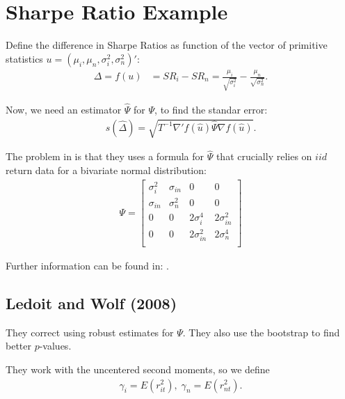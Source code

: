 \documentclass[12pt,oneside,a4paper]{article}
\begin{document}
\clearpage
\section{Sharpe Ratio Example}

Define the difference in Sharpe Ratios as function of the vector of primitive statistics $u = (\mu_{i}, \mu_{n}, \sigma^2_{i}, \sigma^2_{n})'$:
\begin{align}
\Delta = f(u) &= SR_{i} - SR_{n} 
= \frac{\mu_{i}}{\sqrt{\sigma^2_{i}}} - \frac{\mu_{n}}{\sqrt{\sigma^2_{n}}}.
\end{align}

Now, we need an estimator $\hat{\Psi}$ for $\Psi$, to find the standar error:
\begin{align}
s(\hat{\Delta}) = \sqrt{T^{-1} \nabla'f(\hat{u}) \hat{\Psi} \nabla f(\hat{u})}.
\end{align}

The problem in \cite{jb81-sr} is that they uses a formula for $\hat{\Psi}$ that crucially relies on $iid$ return data for a bivariate normal distribution:
\begin{align*}
\Psi = 
\begin{bmatrix}
\sigma^2_{i} & \sigma_{in} & 0 & 0 \\
\sigma_{in} & \sigma^2_{n} & 0 & 0 \\
0 & 0 & 2\sigma^{4}_{i} & 2\sigma^{2}_{in}  \\
0 & 0 & 2\sigma^{2}_{in} & 2\sigma^{4}_{n}  \\
\end{bmatrix}
\end{align*}

Further information can be found in: \cite{lo02-sr, jb81-sr}.

\subsection{Ledoit and Wolf (2008)}

They correct \cite{jb81-sr} using robust estimates for $\Psi$.
They also use the bootstrap to find better $p$-values.

They work with the uncentered second moments, so we define 
\begin{align*}
	\gamma_{i} = E(r_{it}^{2}), \; \gamma_{n} = E(r_{nt}^{2}).
\end{align*}
\end{document}
